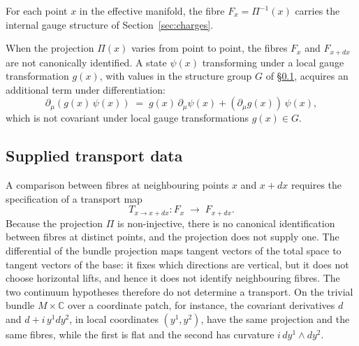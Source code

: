 \documentclass[11pt,a4paper]{article}
\begin{document}
    For each point $x$ in the effective manifold, the fibre $F_x = \Pi^{-1}(x)$
    carries the internal gauge structure of Section~\ref{sec:charges}.

    When the projection $\Pi(x)$ varies from point to point, the fibres $F_x$ and
    $F_{x+dx}$ are not canonically identified.
    A state $\psi(x)$ transforming under a local gauge transformation $g(x)$, with values in the
    structure group $G$ of §\ref{subsec:transport}, acquires an additional term
    under differentiation:
    \begin{equation}
      \partial_\mu(g(x)\,\psi(x))
      \;=\; g(x)\,\partial_\mu\psi(x) + (\partial_\mu g(x))\,\psi(x),
    \end{equation}
    which is not covariant under local gauge transformations $g(x) \in G$.

  \subsection{Supplied transport data}
    \label{subsec:transport}

    A comparison between fibres at neighbouring points $x$ and $x + dx$
    requires the specification of a transport map
    \begin{equation}
      T_{x \to x+dx} : F_x \;\longrightarrow\; F_{x+dx}.
    \end{equation}
    Because the projection $\Pi$ is non-injective, there is no canonical
    identification between fibres at distinct points, and the projection does not supply one.
    The differential of the bundle projection maps tangent vectors of the total space to tangent
    vectors of the base: it fixes which directions are vertical, but it does not choose horizontal
    lifts, and hence it does not identify neighbouring fibres.
    The two continuum hypotheses therefore do not determine a transport.
    On the trivial bundle $M \times \mathbb{C}$ over a coordinate patch, for instance, the covariant
    derivatives $d$ and $d + i\,y^1 dy^2$, in local coordinates $(y^1, y^2)$, have the same projection
    and the same fibres, while the first is flat and the second has curvature $i\,dy^1 \wedge dy^2$.
\end{document}
